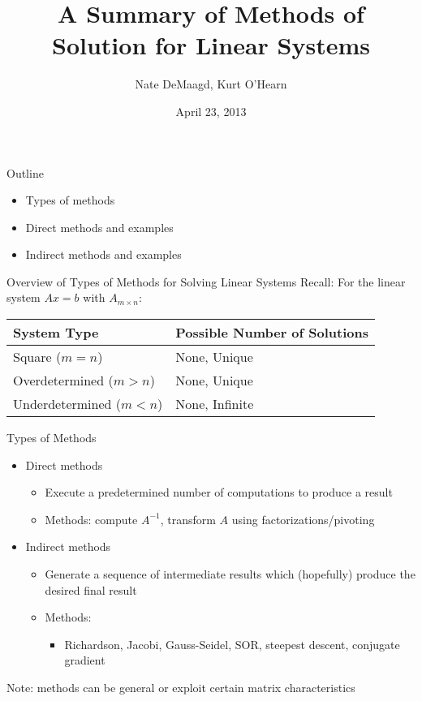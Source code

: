 \documentclass[9pt, serif]{beamer}
\title[Methods of Solution for Linear Systems]
{A Summary of Methods of Solution for Linear Systems}
\author[]
{Nate DeMaagd, Kurt O'Hearn}
\institute[Grand Valley State University]
{MTH 499-02}
\date{April 23, 2013}
\newlength{\wideitemsep}
\let\olditem\item
\renewcommand{\item}{\setlength{\itemsep}{\wideitemsep}\olditem}
\newcommand{\bi}{\begin{itemize}}
\newcommand{\ei}{\end{itemize}}
\begin{document}
\begin{frame}
    \titlepage
\end{frame}


\begin{frame}{Outline}
    \pause
    \bi
        \item Types of methods \pause
        \item Direct methods and examples \pause
        \item Indirect methods and examples
    \ei
\end{frame}


\begin{frame}{Overview of Types of Methods for Solving Linear Systems}
    \pause
    Recall: For the linear system $Ax = b$ with $A_{m\times n}$: \\
    \pause
    \begin{center}
        \begin{tabular}{l|l}
            System Type & Possible Number of Solutions \\ \hline
            Square ($m = n$) & None, Unique \\
            Overdetermined ($m > n$) & None, Unique \\
            Underdetermined ($m < n$) & None, Infinite \\
        \end{tabular}
    \end{center}
    \pause
    Types of Methods
    \bi
        \item Direct methods \pause
        \bi
            \item Execute a predetermined number of computations to produce a result \pause
            \item Methods: compute $A^{-1}$, transform $A$ using factorizations/pivoting \pause
        \ei
        \item Indirect methods \pause
        \bi
            \item Generate a sequence of intermediate results which (hopefully) produce the desired final result \pause
	        \item Methods: \pause
            \bi
                \item Richardson, Jacobi, Gauss-Seidel, SOR, steepest descent, conjugate gradient \pause
            \ei
    	\ei
    \ei
    Note: methods can be general or exploit certain matrix characteristics
\end{frame}
\end{document}
